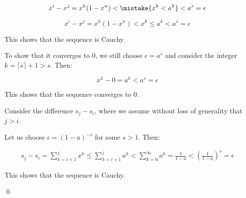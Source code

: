\documentclass[12pt]{article}
\begin{document}
\begin{equation}
    x^{i} - x^{j} = x^{k} (1 - x^{n}) < \mistake{x^{k} < a^{k}} < a^{s} = \epsilon
\end{equation}

\begin{correction}
    \begin{equation}
        x^{i} - x^{j} = x^{k} (1 - x^{n}) < x^{k} \le a^{k} < a^{s} = \epsilon
    \end{equation}
\end{correction}

This shows that the sequence is Cauchy.

To show that it converges to $0$, we still choose $\epsilon = a^{s}$ and consider the integer $k = \lceil s \rceil + 1 > s$. Then:

\begin{equation}
    x^{k} - 0 = a^{k} < a^{s} = \epsilon
\end{equation}

This shows that the sequence converges to $0$.

Consider the difference $s_{j} - s_{i}$, where we assume without loss of generality that $j > i$.

\begin{correction}
    Let us choose $\epsilon = (1-a)^{-s}$ for some $s > 1$. Then:

    \begin{equation}
    \begin{split}
        s_{j} - s_{i} = \sum_{k=i+1}^{j} x^{k} \le \sum_{k=i+1}^{j} a^{k} < \sum_{k=0}^{\infty} a^{k} = \frac{1}{1-a} < \left( \frac{1}{1-a} \right)^{s} = \epsilon
    \end{split}
    \end{equation}

    This shows that the sequence is Cauchy.
\end{correction}
\qed
\end{document}
